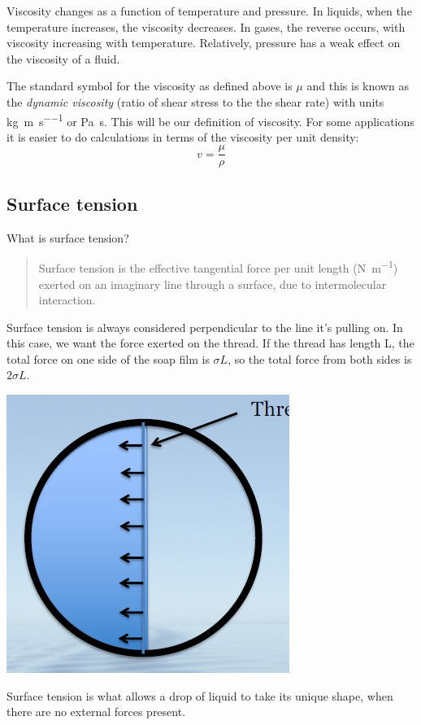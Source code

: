 \documentclass[class=report, crop=false, 12pt,a4paper]{standalone}
\begin{document}
Viscosity changes as a function of temperature and pressure. In liquids, when the temperature increases, the viscosity decreases. In gases, the reverse occurs, with viscosity increasing with temperature. Relatively, pressure has a weak effect on the viscosity of a fluid.

The standard symbol for the viscosity as defined above is \( \mu \) and this is known as the \emph{dynamic viscosity} (ratio of shear stress to the the shear rate) with units \si{\kg\per\meter\per\second} or \si{\pascal \second}. This will be our definition of viscosity. For some applications it is easier to do calculations in terms of the viscosity per unit density:
\begin{equation}
  v = \frac{\mu}{\rho}
\end{equation}

\subsection{Surface tension}
What is surface tension?
\begin{quote}
  \begin{center}
    Surface tension is the effective tangential force per unit length (\si{\newton\per\meter}) exerted on an imaginary line through a surface, due to intermolecular interaction.
  \end{center}
\end{quote}

Surface tension is always considered perpendicular to the line it's pulling on. In this case, we want the force exerted on the thread. If the thread has length L, the total force on one side of the soap film is \(\sigma L\), so the total force from both sides is \(2\sigma L\).
\begin{center}
  \includegraphics[width = 0.4 \textwidth]{../img/SoapFilm}
\end{center}
Surface tension is what allows a drop of liquid to take its unique shape, when there are no external forces present.
\end{document}
